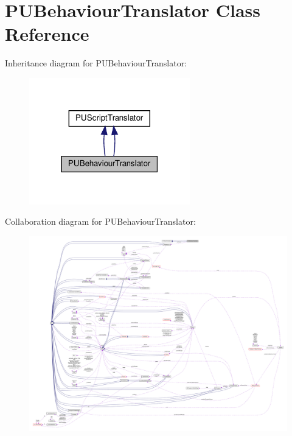 \hypertarget{classPUBehaviourTranslator}{}\section{P\+U\+Behaviour\+Translator Class Reference}
\label{classPUBehaviourTranslator}


Inheritance diagram for P\+U\+Behaviour\+Translator\+:
\nopagebreak
\begin{figure}[H]
\begin{center}
\leavevmode
\includegraphics[width=198pt]{classPUBehaviourTranslator__inherit__graph}
\end{center}
\end{figure}


Collaboration diagram for P\+U\+Behaviour\+Translator\+:
\nopagebreak
\begin{figure}[H]
\begin{center}
\leavevmode
\includegraphics[width=350pt]{classPUBehaviourTranslator__coll__graph}
\end{center}
\end{figure}
